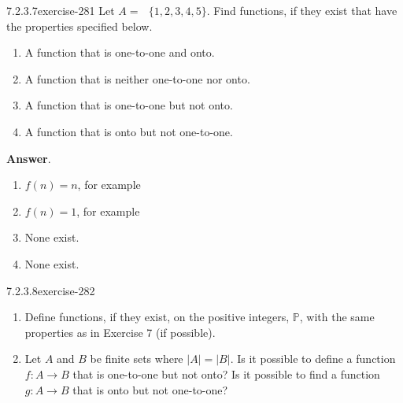 \documentclass[twoside,10pt,]{book}
\numberwithin{equation}{section}
\begin{document}
\begin{divisionsolution}{7.2.3.7}{}{exercise-281}%
\hypertarget{p-2375}{}%
Let \(A =\text{  }\{1, 2, 3, 4, 5\}\). Find functions, if they exist that have the properties specified below.%
\par
\hypertarget{p-2376}{}%
\leavevmode%
\begin{enumerate}[label=(\alph*)]
\item\hypertarget{li-1222}{}\hypertarget{p-2377}{}%
A function that is one-to-one and onto.%
\item\hypertarget{li-1223}{}\hypertarget{p-2378}{}%
A function that is neither one-to-one nor onto.%
\item\hypertarget{li-1224}{}\hypertarget{p-2379}{}%
A function that is one-to-one but not onto.%
\item\hypertarget{li-1225}{}\hypertarget{p-2380}{}%
A function that is onto but not one-to-one.%
\end{enumerate}
%
\par\smallskip%
\noindent\textbf{Answer}.\quad%
\hypertarget{p-2381}{}%
\leavevmode%
\begin{enumerate}[label=(\alph*)]
\item\hypertarget{li-1226}{}\hypertarget{p-2382}{}%
\(f(n)=n\), for example%
\item\hypertarget{li-1227}{}\hypertarget{p-2383}{}%
\(f(n)=1\), for example%
\item\hypertarget{li-1228}{}\hypertarget{p-2384}{}%
None exist.%
\item\hypertarget{li-1229}{}\hypertarget{p-2385}{}%
None exist.%
\end{enumerate}
%
\end{divisionsolution}%
\begin{divisionsolution}{7.2.3.8}{}{exercise-282}%
\hypertarget{p-2386}{}%
\leavevmode%
\begin{enumerate}[label=(\alph*)]
\item\hypertarget{li-1230}{}\hypertarget{p-2387}{}%
Define functions, if they exist, on the positive integers, \(\mathbb{P}\), with the same properties as in Exercise 7 (if possible).%
\item\hypertarget{li-1231}{}\hypertarget{p-2388}{}%
Let \(A\) and \(B\) be finite sets where \(|A|=|B|\). Is it possible to define a function \(f:A \rightarrow  B\) that is one-to-one but not onto? Is it possible to find a function  \(g:A \rightarrow  B\) that is onto but not one-to-one?%
\end{enumerate}
%
\end{divisionsolution}%
\end{document}
